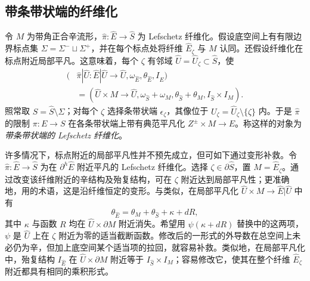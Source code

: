 \subsection{带条带状端的纤维化}\label{sec:17b}
令 $M$ 为带角正合辛流形，$\widehat\pi:\widehat E\to\widehat S$ 为 Lefschetz 纤维化。假设底空间上有有限边界标点集 $\Sigma=\Sigma^-\sqcup\Sigma^+$，并在每个标点处将纤维 $\widehat E_\zeta$ 与 $M$ 认同。还假设纤维化在标点附近局部平凡。这意味着，每个 $\zeta$ 有邻域 $\widehat U=\widehat U_\zeta\subset\widehat S$，使
\[
\begin{aligned}
(&\widehat\pi|\widehat U:\widehat E|\widehat U\to\widehat U,
\omega_{\widehat E},\theta_{\widehat E},I_{\widehat E})\\
&=(\widehat U\times M\to\widehat U,
\omega_{\widehat S}+\omega_M,\theta_{\widehat S}+\theta_M,I_{\widehat S}\times I_M).
\end{aligned}
\]
照常取 $S=\widehat S\setminus\Sigma$；对每个 $\zeta$ 选择条带状端 $\epsilon_\zeta$，其像位于 $U_\zeta=\widehat U_\zeta\setminus\{\zeta\}$ 内。于是 $\widehat\pi$ 的限制 $\pi:E\to S$ 在各条带状端上带有典范平凡化 $Z^\pm\times M\to E$。称这样的对象为\emph{带条带状端的 Lefschetz 纤维化}。

\begin{note}\label{st:17.6}
许多情况下，标点附近的局部平凡性并不预先成立，但可如下通过变形补救。令 $\widehat\pi:\widehat E\to\widehat S$
为在 $\partial^h\widehat E$ 附近平凡的 Lefschetz 纤维化。选择 $\zeta\in\partial\widehat S$，置 $M=\widehat E_\zeta$。通过改变该纤维附近的辛结构及殆复结构，可在 $\zeta$ 附近达到局部平凡性；更准确地，用的术语，这是沿纤维恒定的变形。与类似，在局部平凡化 $\widehat U\times M\to\widehat E|\widehat U$ 中有
\begin{equation}\label{eq:17.9}
\theta_{\widehat E}=\theta_M+\theta_{\widehat S}+\kappa+dR,
\end{equation}
其中 $\kappa$ 与函数 $R$ 均在 $\widehat U\times\partial M$ 附近消失。希望用 $\psi(\kappa+dR)$ 替换中的这两项，$\psi$ 是 $\widehat U$ 上在 $\zeta$ 附近为零的适当截断函数。修改后的一形式的外导数在总空间上未必仍为辛，但加上底空间某个适当项的拉回，就容易补救。类似地，在局部平凡化中，殆复结构 $I_{\widehat E}$ 在 $\widehat U\times\partial M$ 附近等于 $I_{\widehat S}\times I_M$；容易修改它，使其在整个纤维 $\widehat E_\zeta$ 附近都具有相同的乘积形式。
\end{note}

